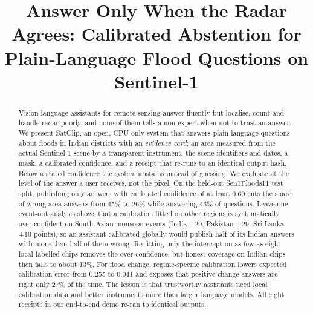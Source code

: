 \documentclass[conference]{IEEEtran}
\begin{document}
\title{Answer Only When the Radar Agrees: Calibrated Abstention for Plain-Language Flood Questions on Sentinel-1}

\author{
}

\maketitle

\begin{abstract}
Vision-language assistants for remote sensing answer fluently but localise, count and handle radar poorly, and none of them tells a non-expert when not to trust an answer. We present SatClip, an open, CPU-only system that answers plain-language questions about floods in Indian districts with an \emph{evidence card}: an area measured from the actual Sentinel-1 scene by a transparent instrument, the scene identifiers and dates, a mask, a calibrated confidence, and a receipt that re-runs to an identical output hash. Below a stated confidence the system abstains instead of guessing. We evaluate at the level of the answer a user receives, not the pixel. On the held-out Sen1Floods11 test split, publishing only answers with calibrated confidence of at least 0.60 cuts the share of wrong area answers from 45\% to 26\% while answering 43\% of questions. Leave-one-event-out analysis shows that a calibration fitted on other regions is systematically over-confident on South Asian monsoon events (India $+20$, Pakistan $+29$, Sri Lanka $+10$ points), so an assistant calibrated globally would publish half of its Indian answers with more than half of them wrong. Re-fitting only the intercept on as few as eight local labelled chips removes the over-confidence, but honest coverage on Indian chips then falls to about 13\%. For flood change, regime-specific calibration lowers expected calibration error from 0.255 to 0.041 and exposes that positive change answers are right only 27\% of the time. The lesson is that trustworthy assistants need local calibration data and better instruments more than larger language models. All eight receipts in our end-to-end demo re-ran to identical outputs.
\end{abstract}
\end{document}
